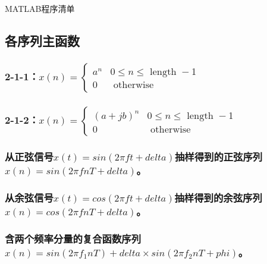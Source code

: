 \documentclass{../source/Experiment}
\begin{document}
        MATLAB程序清单
        \subsection{各序列主函数}
            \subsubsection{2-1-1：$x(n)= \begin{cases}a^{n} & 0 \leq n \leq \text { length }-1 \\ 0 & \text { otherwise }\end{cases}$}
            
            
            
            \subsubsection{2-1-2：$x(n)=\left\{\begin{array}{cl}(a+j b)^{n} & 0 \leq n \leq \text { length }-1 \\ 0 & \text { otherwise }\end{array}\right.$}
            

            \subsubsection{从正弦信号$x(t)=sin(2\pi ft+delta)$抽样得到的正弦序列$x(n)=sin(2\pi fnT+delta)$。}
            

            \subsubsection{从余弦信号$x(t)=cos(2\pi ft+delta)$抽样得到的余弦序列$x(n)=cos(2\pi fnT+delta)$。}
            
            
            \subsubsection{含两个频率分量的复合函数序列$x(n)=sin(2\pi f_1 n T)+delta \times sin(2\pi f_2 nT+phi)$。}
\end{document}

